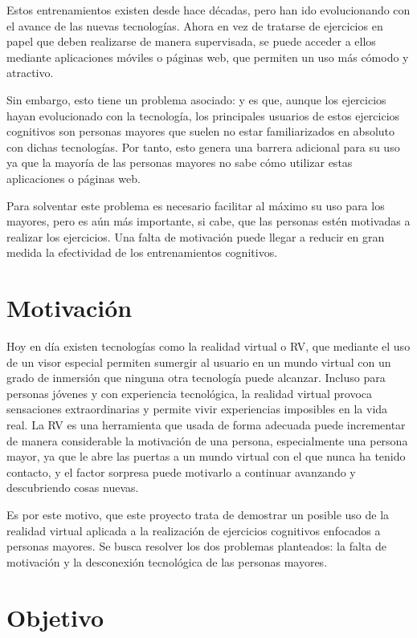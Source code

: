 Estos entrenamientos existen desde hace décadas, pero han ido evolucionando con el avance de las nuevas tecnologías. Ahora en vez de tratarse de ejercicios en papel que deben realizarse de manera supervisada, se puede acceder a ellos mediante aplicaciones móviles o páginas web, que permiten un uso más cómodo y atractivo.

Sin embargo, esto tiene un problema asociado: y es que, aunque los ejercicios hayan evolucionado con la tecnología, los principales usuarios de estos ejercicios cognitivos son personas mayores que suelen no estar familiarizados en absoluto con dichas tecnologías. Por tanto, esto genera una barrera adicional para su uso ya que la mayoría de las personas mayores no sabe cómo utilizar estas aplicaciones o páginas web.

Para solventar este problema es necesario facilitar al máximo su uso para los mayores, pero es aún más importante, si cabe, que las personas estén motivadas a realizar los ejercicios. Una falta de motivación puede llegar a reducir en gran medida la efectividad de los entrenamientos cognitivos. 



\section{Motivación}

Hoy en día existen tecnologías como la realidad virtual o RV, que mediante el uso de un visor especial permiten sumergir al usuario en un mundo virtual con un grado de inmersión que ninguna otra tecnología puede alcanzar. Incluso para personas jóvenes y con experiencia tecnológica, la realidad virtual provoca sensaciones extraordinarias y permite vivir experiencias imposibles en la vida real. La RV es una herramienta que usada de forma adecuada puede incrementar de manera considerable la motivación de una persona, especialmente una persona mayor, ya que le abre las puertas a un mundo virtual con el que nunca ha tenido contacto, y el factor sorpresa puede motivarlo a continuar avanzando y descubriendo cosas nuevas.

Es por este motivo, que este proyecto trata de demostrar un posible uso de la realidad virtual aplicada a la realización de ejercicios cognitivos enfocados a personas mayores. Se busca resolver los dos problemas planteados: la falta de motivación y la desconexión tecnológica de las personas mayores.


\section{Objetivo}

